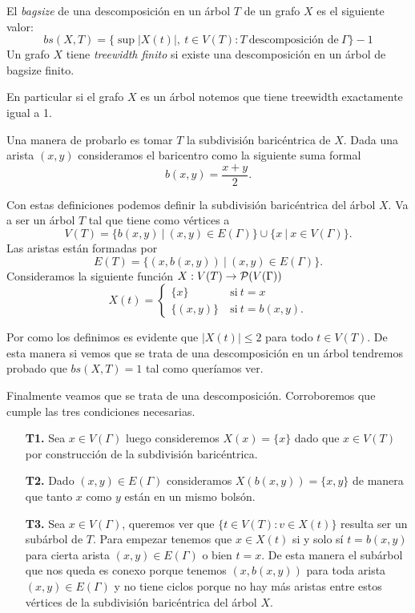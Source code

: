 \documentclass[tesis.tex]{subfiles}
\begin{document}
\begin{deff}
	El \emph{bagsize} de una descomposición en un árbol $T$ de un grafo $X$ es el siguiente valor:
	\begin{equation*}
		bs(X,T) = \{ \sup |X(t)|, \ t \in V(T) : T \ \text{descomposición de} \ \Gamma \} - 1
	\end{equation*}
	Un grafo $X$ tiene \emph{treewidth finito} si existe una descomposición en un árbol de bagsize finito.	
\end{deff}
\begin{ej}\label{desc-arbol-arbol}
	En particular si el grafo $X$ es un árbol notemos que tiene treewidth exactamente igual a 1.
	
	Una manera de probarlo es tomar $T$ la subdivisión baricéntrica de $X$. 
	Dada una arista $(x,y)$ consideramos el baricentro como la siguiente suma formal
	\[
	b(x,y)  = \frac{x+y}{2}.
	\]
	
	
	Con estas definiciones podemos definir la subdivisión baricéntrica del árbol $X$.
	Va a ser un árbol $T$ tal que tiene como vértices a 
	\[
	V(T) = \{ b(x,y) \ | \ (x,y) \in E(\Gamma) \} \cup \{  x \ | \ x \in V(\Gamma)  \}.
	\]
	Las aristas están formadas por 
	\[
	E(T) = \{  (x,b(x,y)) \ | \ (x,y) \in E(\Gamma) \}.
	\]
	Consideramos la siguiente función $X: V(T) \to {\cal P}(V(\Gamma))$  
	\[
	X(t) = 
	\begin{cases}
		\{ x \} \ & \text{si} \ t = x 				\\
		\{ (x,y)  \} \ &\text{si} \ t = b(x,y).
	\end{cases}
	\]
	
	Por como los definimos es evidente que $|X(t)| \le 2$ para todo $t \in V(T)$.
	De esta manera si vemos que se trata de una descomposición en un árbol tendremos probado que $bs(X,T) = 1$ tal como queríamos ver.
	
	Finalmente veamos que se trata de una descomposición. Corroboremos que cumple las tres condiciones necesarias.
	\begin{enumerate}
		\item[\textbf{T1.}] 
		Sea $x \in V(\Gamma)$ luego consideremos $X(x) = \{ x \}$ dado que $x \in V(T)$ por construcción de la subdivisión baricéntrica.
		
		\item[\textbf{T2.}] 
		Dado $(x,y) \in E(\Gamma)$ consideramos $X({b(x,y)}) = \{ x,y \} $ de manera que tanto $x$ como $y$ están en un mismo bolsón.
		
		\item[\textbf{T3.}] 
		Sea $x \in V(\Gamma)$, queremos ver que $\{ t \in V(T) :  v \in X(t) \}$ resulta ser un subárbol de $T$.		
		Para empezar tenemos que $x \in X(t)$ si y solo sí $t = b(x,y)$ para cierta arista $(x,y) \in E(\Gamma)$ o bien $t = x$.
		De esta manera el subárbol que nos queda es conexo porque tenemos $(x,b(x,y))$ para toda arista $(x,y) \in E(\Gamma)$ y no tiene ciclos porque no hay más aristas entre estos vértices de la subdivisión baricéntrica del árbol $X$.
	\end{enumerate}
\end{ej}
\end{document}

